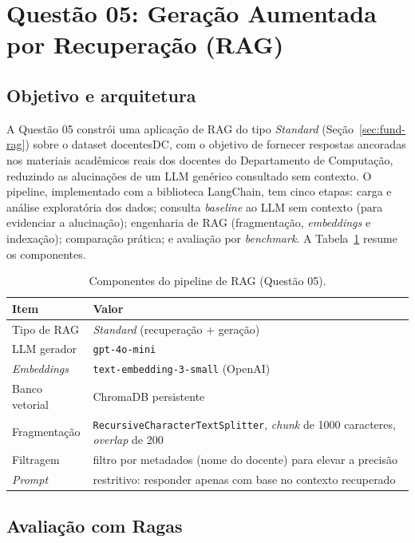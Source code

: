 \section{Questão 05: Geração Aumentada por Recuperação (RAG)}
\label{sec:q5}

\subsection{Objetivo e arquitetura}

A Questão 05 constrói uma aplicação de RAG do tipo \textit{Standard}
(Seção~\ref{sec:fund-rag}) sobre o dataset docentesDC, com o objetivo de fornecer
respostas ancoradas nos materiais acadêmicos reais dos docentes do Departamento de
Computação, reduzindo as alucinações de um LLM genérico consultado sem contexto. O
pipeline, implementado com a biblioteca LangChain, tem cinco etapas: carga e análise
exploratória dos dados; consulta \textit{baseline} ao LLM sem contexto (para
evidenciar a alucinação); engenharia de RAG (fragmentação, \textit{embeddings} e
indexação); comparação prática; e avaliação por \textit{benchmark}. A
Tabela~\ref{tab:q5-config} resume os componentes.

\begin{table}[ht]
  \centering
  \caption{Componentes do pipeline de RAG (Questão 05).}
  \label{tab:q5-config}
  \footnotesize
  \begin{tabularx}{0.92\textwidth}{@{}l X@{}}
    \toprule
    \textbf{Item} & \textbf{Valor} \\
    \midrule
    Tipo de RAG & \textit{Standard} (recuperação + geração) \\
    LLM gerador & \texttt{gpt-4o-mini} \\
    \textit{Embeddings} & \texttt{text-embedding-3-small} (OpenAI) \\
    Banco vetorial & ChromaDB persistente \\
    Fragmentação & \texttt{RecursiveCharacterTextSplitter}, \textit{chunk} de 1000 caracteres, \textit{overlap} de 200 \\
    Filtragem & filtro por metadados (nome do docente) para elevar a precisão \\
    \textit{Prompt} & restritivo: responder apenas com base no contexto recuperado \\
    \bottomrule
  \end{tabularx}
\end{table}

\subsection{Avaliação com Ragas}

